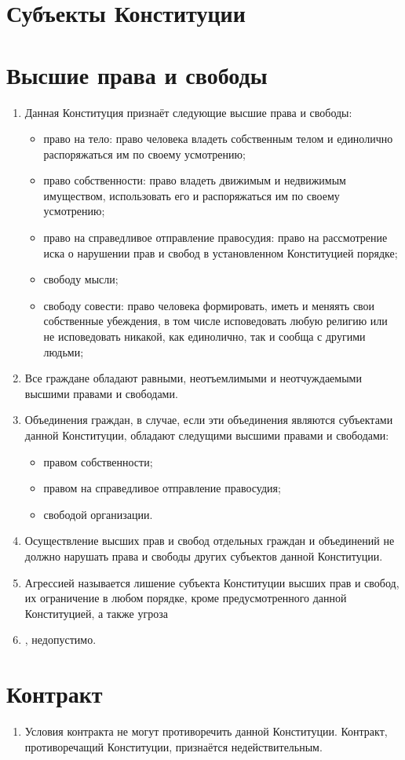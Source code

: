 
\section{Субъекты Конституции} %

\section{Высшие права и свободы}
\begin{enumerate}
    \item Данная Конституция признаёт следующие высшие права и свободы:
    \begin{itemize}
        \item право на тело: право человека владеть собственным телом и единолично распоряжаться им по своему усмотрению;
        \item право собственности: право владеть движимым и недвижимым имуществом, использовать его и распоряжаться им по своему усмотрению;
        \item право на справедливое отправление правосудия: право на рассмотрение иска о нарушении прав и свобод в установленном Конституцией порядке;
        \item свободу мысли;
        \item свободу совести: право человека формировать, иметь и меняять свои собственные убеждения, в том числе исповедовать любую религию или не исповедовать никакой, как единолично, так и сообща с другими людьми;
    \end{itemize}
    \item Все граждане обладают равными, неотъемлимыми и неотчуждаемыми высшими правами и свободами.
    \item Объединения граждан, в случае, если эти объединения являются субъектами данной Конституции, обладают следущими высшими правами и свободами:
    \begin{itemize}
        \item правом собственности;
        \item правом на справедливое отправление правосудия;
        \item свободой организации.
    \end{itemize}
    \item Осуществление высших прав и свобод отдельных граждан и объединений не должно нарушать права и свободы других субъектов данной Конституции.
    \item Агрессией называется лишение субъекта Конституции высших прав и свобод, их ограничение в любом порядке, кроме предусмотренного данной Конституцией, а также угроза 
    \item , недопустимо.
    
\end{enumerate}
\section{Контракт}
\begin{enumerate}
    
    
    
    
    \item Условия контракта не могут противоречить данной Конституции. Контракт, противоречащий Конституции, признаётся недействительным.
\end{enumerate}
